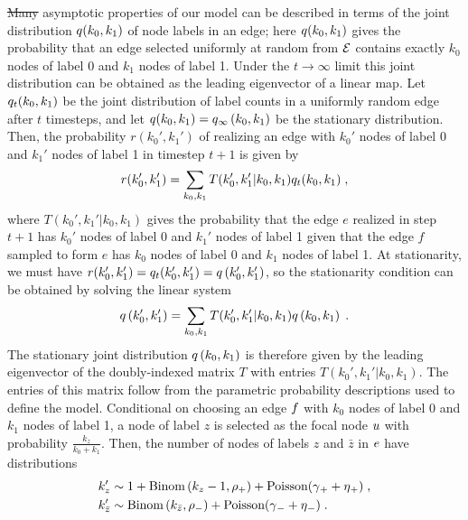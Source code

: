 \documentclass[aps,pre,reprint,superscriptaddress,nofootinbib]{revtex4-2}
\makeatletter
\providecommand{\DIFaddtex}[1]{{\protect\color{blue}\uwave{#1}}} %
\providecommand{\DIFdeltex}[1]{{\protect\color{red}\sout{#1}}} %
\providecommand{\DIFaddbegin}{} %
\providecommand{\DIFaddend}{} %
\providecommand{\DIFdelbegin}{} %
\providecommand{\DIFdelend}{} %
\providecommand{\DIFadd}[1]{\texorpdfstring{\DIFaddtex{#1}}{#1}} %
\providecommand{\DIFdel}[1]{\texorpdfstring{\DIFdeltex{#1}}{}} %
\providecommand{\DIFscaledelfig}{0.5}
\newlength{\DIFdelgraphicswidth} %
\newlength{\DIFdelgraphicsheight} %
\providecommand{\DIFaddincludegraphics}[2][]{{\color{blue}\fbox{\DIFOincludegraphics[#1]{#2}}}} %
\providecommand{\DIFdelincludegraphics}[2][]{%
\sbox{\DIFdelgraphicsbox}{\DIFOincludegraphics[#1]{#2}}%
\settoboxwidth{\DIFdelgraphicswidth}{\DIFdelgraphicsbox} %
\settoboxtotalheight{\DIFdelgraphicsheight}{\DIFdelgraphicsbox} %
\scalebox{\DIFscaledelfig}{%
\parbox[b]{\DIFdelgraphicswidth}{\usebox{\DIFdelgraphicsbox}\\[-\baselineskip] \rule{\DIFdelgraphicswidth}{0em}}\llap{\resizebox{\DIFdelgraphicswidth}{\DIFdelgraphicsheight}{%
\setlength{\unitlength}{\DIFdelgraphicswidth}%
\begin{picture}(1,1)%
\thicklines\linethickness{2pt} %
{\color[rgb]{1,0,0}\put(0,0){\framebox(1,1){}}}%
{\color[rgb]{1,0,0}\put(0,0){\line( 1,1){1}}}%
{\color[rgb]{1,0,0}\put(0,1){\line(1,-1){1}}}%
\end{picture}%
}\hspace*{3pt}}} %
} %
\DeclareRobustCommand{\DIFaddbegin}{\DIFOaddbegin \let\includegraphics\DIFaddincludegraphics} %
\DeclareRobustCommand{\DIFaddend}{\DIFOaddend \let\includegraphics\DIFOincludegraphics} %
\DeclareRobustCommand{\DIFdelbegin}{\DIFOdelbegin \let\includegraphics\DIFdelincludegraphics} %
\DeclareRobustCommand{\DIFdelend}{\DIFOaddend \let\includegraphics\DIFOincludegraphics} %
\let\sout@orig\sout %
\renewcommand{\sout}[1]{\ifmmode\text{\sout@orig{\ensuremath{#1}}}\else\sout@orig{#1}\fi} %
\makeatother
\begin{document}
    \DIFdelbegin \DIFdel{Many }\DIFdelend \DIFaddbegin \DIFadd{Several }\DIFaddend asymptotic properties of our \model{} model can be described in terms of the joint distribution $q(k_0, k_1)$ of node labels in an edge; here $q(k_0, k_1)$ gives the probability that an edge selected uniformly at random from $\mathcal{E}$ contains exactly $k_0$ nodes of label 0 and $k_1$ nodes of label 1.
    Under the $t\rightarrow \infty$ limit this joint distribution can be obtained as the leading eigenvector of a linear map. 
    Let $q_{t}(k_0, k_1)$ be the joint distribution of label counts in a uniformly random edge after $t$ timesteps, and let $q(k_0, k_1) = q_{\infty} \left( k_0, k_1 \right)$ be the stationary distribution.
    Then, the probability $r(k_0', k_1')$ of realizing an edge with $k_0'$ nodes of label 0 and $k_1'$ nodes of label 1 in timestep $t+1$ is given by 
    \begin{align*}
        r(k_0', k_1') = \sum_{k_0, k_1} T(k_0', k_1' | k_0, k_1)q_{t}(k_0, k_1)  \;,
    \end{align*}
    where $T(k_0', k_1' | k_0, k_1)$ gives the probability that the edge $e$ realized in step $t+1$ has $k_0'$ nodes of label 0 and $k_1'$ nodes of label 1 given that the edge $f$ sampled to form $e$ has $k_0$ nodes of label 0 and $k_1$ nodes of label 1.
    At stationarity, we must have $r(k_0', k_1') = q_{t}(k_0', k_1') = q \left( k_0', k_1' \right)$, so the stationarity condition can be obtained by solving the linear system 
    \begin{align*}
        q \left( k_0', k_1' \right) = \sum_{k_0, k_1} T(k_0', k_1' | k_0, k_1)q \left( k_0, k_1 \right)  \;.
    \end{align*}
    The stationary joint distribution $q \left( k_0, k_1 \right)$ is therefore given by the leading eigenvector of the doubly-indexed matrix $T$ with entries $T(k_0', k_1' | k_0, k_1)$. 
    The entries of this matrix follow from the parametric probability descriptions used to define the \model{} model.
    Conditional on choosing an edge $f$ with $k_0$ nodes of label 0 and $k_1$ nodes of label 1, a node of label $z$ is selected as the focal node $u$ with probability $\frac{k_z}{k_0 + k_1}$.
    Then, the number of nodes of labels $z$ and $\bar{z}$ in $e$ have distributions
    \begin{align*}
        k_z' &\sim 1 + \text{Binom}\left( k_z - 1, \rho{}_+ \right) + \text{Poisson}(\gamma{}_+ + \eta{}_+) \;, \\
        k_{\bar{z}}' &\sim \text{Binom}\left( k_{\bar{z}}, \rho{}_- \right) + \text{Poisson}(\gamma{}_- + \eta{}_-) \;.
    \end{align*}
\end{document}
